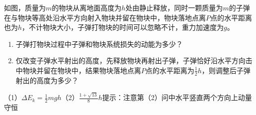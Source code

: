 如图，质量为\(m\)的物块从离地面高度为\(h\)处由静止释放，同时一颗质量为\(m\)的子弹在与物块等高处沿水平方向射入物块并留在物块中，物块落地点离\(P\)点的水平距离也为\(h\)，不计物块大小，子弹打物块的时间可以忽略不计，重力加速度为\(g\)。
\begin{enumerate}
    \item 子弹打物块过程中子弹和物块系统损失的动能为多少？
    \item 仅改变子弹水平射出的高度，先释放物块再射出子弹，子弹恰好沿水平方向击中物块并留在物块中，结果物块落地点离\(P\)点的水平距离为\(\frac{1}{2}h\)，则调整后子弹射出的高度为多少？
\end{enumerate}
\begin{answer}
    （1）\(\Delta E_k = \frac{1}{2}mgh\)（2）\(\frac{1 + \sqrt{13}}{8}h\)\qquad 提示：注意第（2）问中水平竖直两个方向上动量守恒
\end{answer}